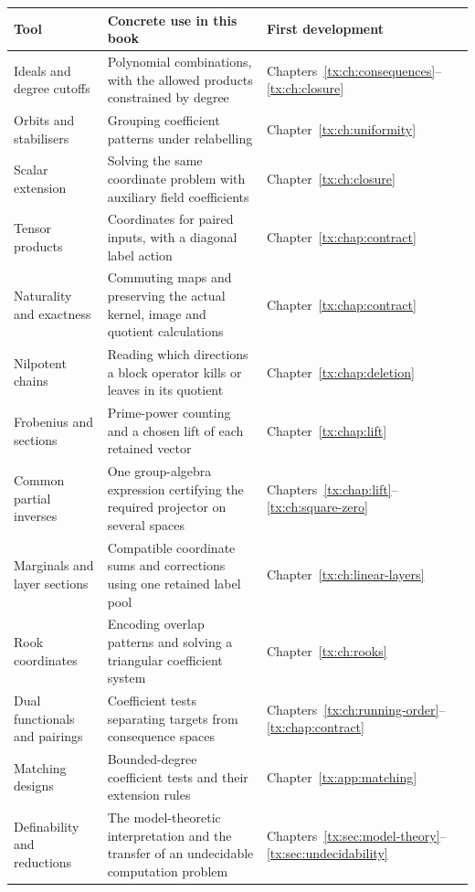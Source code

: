 \begin{longtable}{@{}p{.23\linewidth}p{.47\linewidth}p{.22\linewidth}@{}}
\toprule
Tool & Concrete use in this book & First development\\
\midrule
Ideals and degree cutoffs & Polynomial combinations, with the
allowed products constrained by degree & Chapters~\ref{tx:ch:consequences}--\ref{tx:ch:closure}\\
Orbits and stabilisers & Grouping coefficient patterns under relabelling
& Chapter~\ref{tx:ch:uniformity}\\
Scalar extension & Solving the same coordinate problem with auxiliary
field coefficients & Chapter~\ref{tx:ch:closure}\\
Tensor products & Coordinates for paired inputs, with a diagonal
label action & Chapter~\ref{tx:chap:contract}\\
Naturality and exactness & Commuting maps and preserving the actual
kernel, image and quotient calculations & Chapter~\ref{tx:chap:contract}\\
Nilpotent chains & Reading which directions a block operator kills
or leaves in its quotient & Chapter~\ref{tx:chap:deletion}\\
Frobenius and sections & Prime-power counting and a chosen lift of
each retained vector & Chapter~\ref{tx:chap:lift}\\
Common partial inverses & One group-algebra expression certifying
the required projector on several spaces & Chapters~\ref{tx:chap:lift}--\ref{tx:ch:square-zero}\\
Marginals and layer sections & Compatible coordinate sums and
corrections using one retained label pool & Chapter~\ref{tx:ch:linear-layers}\\
Rook coordinates & Encoding overlap patterns and solving a
triangular coefficient system & Chapter~\ref{tx:ch:rooks}\\
Dual functionals and pairings & Coefficient tests separating targets
from consequence spaces & Chapters~\ref{tx:ch:running-order}--\ref{tx:chap:contract}\\
Matching designs & Bounded-degree coefficient tests and their
extension rules & Chapter~\ref{tx:app:matching}\\
Definability and reductions & The model-theoretic interpretation and
the transfer of an undecidable computation problem & Chapters~\ref{tx:sec:model-theory}--\ref{tx:sec:undecidability}\\
\bottomrule
\end{longtable}

